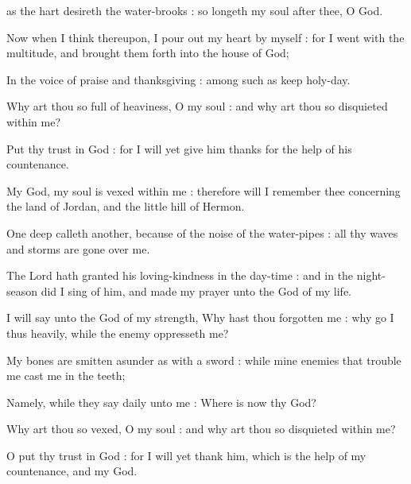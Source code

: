 as the hart desireth the water-brooks : so longeth my soul after thee, O God.\par
{}
Now when I think thereupon, I pour out my heart by myself : for I went with the multitude, and brought them forth into the house of God;\par
{}In the voice of praise and thanksgiving : among such as keep holy-day.\par
{}Why art thou so full of heaviness, O my soul : and why art thou so disquieted within me?\par
{}Put thy trust in God : for I will yet give him thanks for the help of his countenance.\par
{}My God, my soul is vexed within me : therefore will I remember thee concerning the land of Jordan, and the little hill of Hermon.\par
{}One deep calleth another, because of the noise of the water-pipes : all thy waves and storms are gone over me.\par
{}The Lord hath granted his loving-kindness in the day-time : and in the night-season did I sing of him, and made my prayer unto the God of my life.\par
{}I will say unto the God of my strength, Why hast thou forgotten me : why go I thus heavily, while the enemy oppresseth me?\par
{}My bones are smitten asunder as with a sword : while mine enemies that trouble me cast me in the teeth;\par
{}Namely, while they say daily unto me : Where is now thy God?\par
{}Why art thou so vexed, O my soul : and why art thou so disquieted within me?\par
{}O put thy trust in God : for I will yet thank him, which is the help of my countenance, and my God.\par


